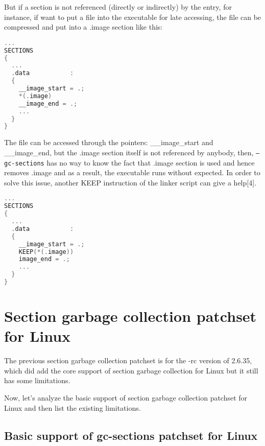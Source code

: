 \documentclass[10pt,a4paper]{article}
\begin{document}
\begin{multicols}{2}
But if a section is not referenced (directly or indirectly) by the entry, for
instance, if want to put a file into the executable for late accessing, the
file can be compressed and put into a .image section like this:

\begin{lstlisting}[language=c,
                  commentstyle=\fontsize{7}{8}\selectfont,
                  basicstyle=\ttfamily\fontsize{7}{8}\selectfont]
...
SECTIONS
{
  ...
  .data           :
  {
    __image_start = .;
    *(.image)
    __image_end = .;
    ...
  }
}
\end{lstlisting}

The file can be accessed through the pointers: \_\_image\_start and
\_\_image\_end, but the .image section itself is not referenced by anybody, then,
{\small {\tt --gc-sections}} has no way to know the fact that .image section is
used and hence removes .image and as a result, the executable runs without
expected. In order to solve this issue, another KEEP instruction of the linker
script can give a help[4].

\begin{lstlisting}[language=c,
                  commentstyle=\fontsize{7}{8}\selectfont,
                  basicstyle=\ttfamily\fontsize{7}{8}\selectfont]
...
SECTIONS
{
  ...
  .data           :
  {
    __image_start = .;
    KEEP(*(.image))
    image_end = .;
    ...
  }
}
\end{lstlisting}

\section{Section garbage collection patchset for Linux}

The previous section garbage collection patchset is for the -rc version of
2.6.35, which did add the core support of section garbage collection for Linux
but it still has some limitations.

Now, let's analyze the basic support of section garbage collection patchset for
Linux and then list the existing limitations.

\subsection{Basic support of gc-sections patchset for Linux}


\end{multicols}
\end{document}
